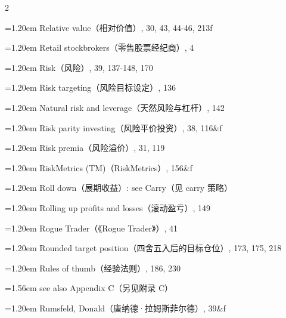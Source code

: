 {\begin{multicols}{2}
\par \noindent\hangindent=1.20em\hspace*{0.00em} Relative value（相对价值）, 30, 43, 44-46, 213f
\par \noindent\hangindent=1.20em\hspace*{0.00em} Retail stockbrokers（零售股票经纪商）, 4
\par \noindent\hangindent=1.20em\hspace*{0.00em} Risk（风险）, 39, 137-148, 170
\par \noindent\hangindent=1.20em\hspace*{0.00em} Risk targeting（风险目标设定）, 136
\par \noindent\hangindent=1.20em\hspace*{0.00em} Natural risk and leverage（天然风险与杠杆）, 142
\par \noindent\hangindent=1.20em\hspace*{0.00em} Risk parity investing（风险平价投资）, 38, 116\&f
\par \noindent\hangindent=1.20em\hspace*{0.00em} Risk premia（风险溢价）, 31, 119
\par \noindent\hangindent=1.20em\hspace*{0.00em} RiskMetrics (TM)（RiskMetrics）, 156\&f
\par \noindent\hangindent=1.20em\hspace*{0.00em} Roll down（展期收益）: see Carry（见 carry 策略）
\par \noindent\hangindent=1.20em\hspace*{0.00em} Rolling up profits and losses（滚动盈亏）, 149
\par \noindent\hangindent=1.20em\hspace*{0.00em} Rogue Trader（《Rogue Trader》）, 41
\par \noindent\hangindent=1.20em\hspace*{0.00em} Rounded target position（四舍五入后的目标仓位）, 173, 175, 218
\par \noindent\hangindent=1.20em\hspace*{0.00em} Rules of thumb（经验法则）, 186, 230
\par \noindent\hangindent=1.56em\hspace*{0.36em} see also Appendix C（另见附录 C）
\par \noindent\hangindent=1.20em\hspace*{0.00em} Rumsfeld, Donald（唐纳德·拉姆斯菲尔德）, 39\&f

\end{multicols}}

